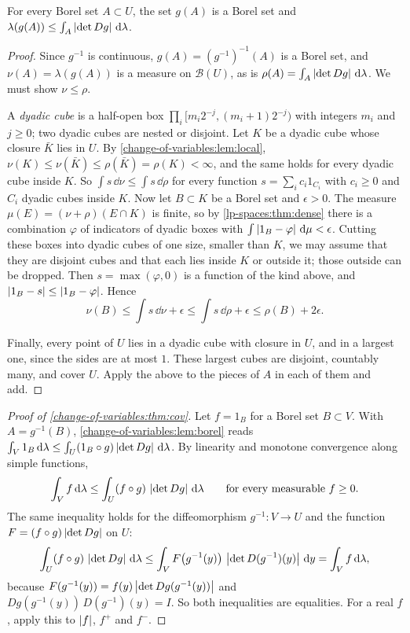 \begin{notechapter}
\begin{lemma}\label{change-of-variables:lem:borel}
For every Borel set $A\subset U$, the set $g(A)$ is a Borel set and
$\lambda(g(A))\leq\int_A\left|\det Dg\right|\,\mathrm{d}\lambda$.
\end{lemma}

\begin{proof}
Since $g^{-1}$ is continuous, $g(A) = (g^{-1})^{-1}(A)$ is a Borel set,
and $\nu(A) = \lambda(g(A))$ is a measure on $\mathcal B(U)$, as is
$\rho(A) = \int_A\left|\det Dg\right|\,\mathrm{d}\lambda$. We must show
$\nu\leq\rho$.

A \emph{dyadic cube} is a half-open box
$\prod_i[m_i2^{-j}, (m_i + 1)2^{-j})$ with integers $m_i$ and $j\geq0$;
two dyadic cubes are nested or disjoint. Let $K$ be a dyadic cube whose
closure $\bar K$ lies in $U$. By \cref{change-of-variables:lem:local},
$\nu(K)\leq\nu(\bar K)\leq\rho(\bar K) = \rho(K) < \infty$, and the same
holds for every dyadic cube inside $K$. So $\int s\,\dd\nu
\leq\int s\,\dd\rho$ for every function $s = \sum_ic_i1_{C_i}$ with
$c_i\geq0$ and $C_i$ dyadic cubes inside $K$. Now let $B\subset K$ be a
Borel set and $\epsilon > 0$. The measure $\mu(E) = (\nu + \rho)(E\cap K)$
is finite, so by \cref{lp-spaces:thm:dense} there is a combination
$\varphi$ of indicators of dyadic boxes with
$\int\left|1_B - \varphi\right|\,\mathrm{d}\mu < \epsilon$. Cutting these boxes into
dyadic cubes of one size, smaller than $K$, we may assume that they are
disjoint cubes and that each lies inside $K$ or outside it; those
outside can be dropped. Then
$s = \max(\varphi, 0)$ is a function of the kind above, and
$\left|1_B - s\right|\leq\left|1_B - \varphi\right|$. Hence
\[
  \nu(B)\leq\int s\,\dd\nu + \epsilon\leq\int s\,\dd\rho + \epsilon
  \leq\rho(B) + 2\epsilon .
\]

Finally, every point of $U$ lies in a dyadic cube with closure in $U$,
and in a largest one, since the sides are at most $1$. These largest
cubes are disjoint, countably many, and cover $U$. Apply the above to
the pieces of $A$ in each of them and add.
\end{proof}

\begin{proof}[Proof of \cref{change-of-variables:thm:cov}]
Let $f = 1_B$ for a Borel set $B\subset V$. With $A = g^{-1}(B)$,
\cref{change-of-variables:lem:borel} reads
$\int_V1_B\,\mathrm{d}\lambda\leq\int_U(1_B\circ g)\left|\det Dg\right|\,\mathrm{d}\lambda$. By
linearity and monotone convergence along simple functions,
\[
  \int_Vf\,\mathrm{d}\lambda\leq\int_U(f\circ g)\,\left|\det Dg\right|\,\mathrm{d}\lambda
  \qquad\text{for every measurable }f\geq0 .
\]
The same inequality holds for the diffeomorphism $g^{-1}:V\to U$ and the
function $F = (f\circ g)\left|\det Dg\right|$ on $U$:
\[
  \int_U(f\circ g)\,\left|\det Dg\right|\,\mathrm{d}\lambda
  \leq\int_VF\bigl(g^{-1}(y)\bigr)\,\left|\det D(g^{-1})(y)\right|\,\mathrm{d} y
  = \int_Vf\,\mathrm{d}\lambda ,
\]
because $F(g^{-1}(y)) = f(y)\left|\det Dg(g^{-1}(y))\right|$ and
$Dg(g^{-1}(y))\,D(g^{-1})(y) = I$. So both inequalities are equalities.
For a real $f$, apply this to $\left|f\right|$, $f^+$ and $f^-$.
\end{proof}


\end{notechapter}
